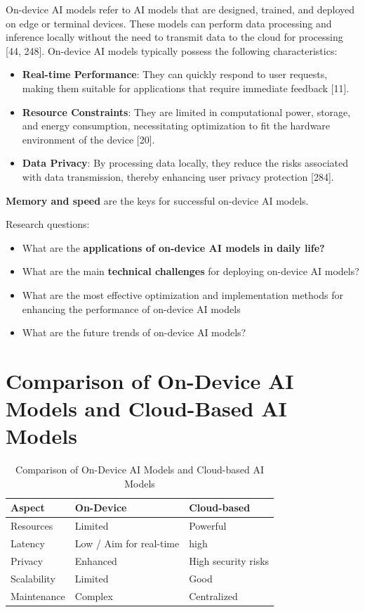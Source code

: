 On-device AI models refer to AI models that are designed, trained, and deployed on edge or terminal devices. These models can perform data processing and inference locally without the need to transmit data to the cloud for processing [44, 248]. On-device AI models typically possess the following characteristics:
\begin{itemize}
	\item \textbf{Real-time Performance}: They can quickly respond to user requests, making them suitable for applications that require immediate feedback [11].
	\item \textbf{Resource Constraints}: They are limited in computational power, storage, and energy consumption, necessitating optimization to fit the hardware environment of the device [20].
	\item \textbf{Data Privacy}: By processing data locally, they reduce the risks associated with data transmission, thereby enhancing user privacy protection [284].
\end{itemize}

\textbf{Memory and speed} are the keys for successful on-device AI models.

Research questions:
\begin{itemize}
	\item What are the \textbf{applications of on-device AI models in daily life?}
	\item What are the main \textbf{technical challenges} for deploying on-device AI models?
	\item What are the most effective optimization and implementation methods for enhancing the performance of on-device AI models
	\item What are the future trends of on-device AI models?
\end{itemize}

\section{Comparison of On-Device AI Models and Cloud-Based AI Models}


\begin{table}[t]
	\setlength{\tabcolsep}{10pt}
	\caption{Comparison of On-Device AI Models and Cloud-based AI Models}
	\centering
	\begin{tabular}{lll}
		\toprule
		\bf Aspect & \bf On-Device &\bf  Cloud-based \\
		\midrule
		Resources & Limited & Powerful \\
		Latency & Low / Aim for real-time & high\\
		Privacy & Enhanced & High security risks\\
		Scalability & Limited & Good \\
		Maintenance & Complex & Centralized \\
		\bottomrule
	\end{tabular}
\end{table}

